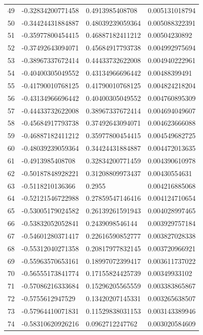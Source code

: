 \documentclass{amsart}
\numberwithin{equation}{section}
\numberwithin{table}{section}
\begin{document}
\begin{longtable}{@{}rlll@{}}
49 & -0.32834200771458 & 0.4913985408708 & 0.005131018794 \\
50 & -0.34424431884887 & 0.48039239059364 & 0.005088322391 \\
51 & -0.35977800454415 & 0.46887182411212 & 0.00504230892 \\
52 & -0.37492643094071 & 0.45684917793738 & 0.004992975694 \\
53 & -0.38967337672414 & 0.44433732622008 & 0.004940222961 \\
54 & -0.40400305049552 & 0.43134966696442 & 0.00488399491 \\
55 & -0.41790010768125 & 0.41790010768125 & 0.004824218204 \\
56 & -0.43134966696442 & 0.40400305049552 & 0.004760895309 \\
57 & -0.44433732622008 & 0.38967337672414 & 0.004694049607 \\
58 & -0.45684917793738 & 0.37492643094071 & 0.004623666088 \\
59 & -0.46887182411212 & 0.35977800454415 & 0.004549682725 \\
60 & -0.48039239059364 & 0.34424431884887 & 0.004472013635 \\
61 & -0.4913985408708 & 0.32834200771459 & 0.004390610978 \\
62 & -0.50187848928221 & 0.31208809973437 & 0.00430554631 \\
63 & -0.5118210136366 & 0.2955 & 0.004216885068 \\
64 & -0.52121546722988 & 0.27859547146416 & 0.004124710654 \\
65 & -0.53005179024582 & 0.26139261591943 & 0.004028997465 \\
66 & -0.53832052052841 & 0.2439098546144 & 0.003929757184 \\
67 & -0.54601280371417 & 0.22616590852777 & 0.003827028338 \\
68 & -0.55312040271358 & 0.20817977832145 & 0.003720966921 \\
69 & -0.55963570653161 & 0.18997072399417 & 0.003611737022 \\
70 & -0.56555173841774 & 0.17155824425739 & 0.00349933102 \\
71 & -0.57086216333684 & 0.15296205565559 & 0.003383865867 \\
72 & -0.5755612947529 & 0.13420207145331 & 0.003265638507 \\
73 & -0.57964410071831 & 0.11529838031153 & 0.003143389946 \\
74 & -0.58310620926216 & 0.0962712247762 & 0.003020584609 \\

\end{longtable}
\end{document}
